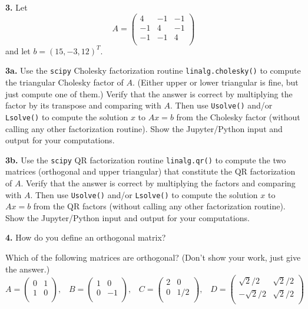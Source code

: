 \documentclass[11pt]{article}
\begin{document}
\par\newpage
{\bf 3.} 
Let
$$A =
   \left(
   \begin{array}{ccc}
    4 & -1 & -1 \\ 	
   -1 &  4 & -1 \\ 
   -1 & -1 &  4 \\
   \end{array} \right)
$$
and let $b = (15, -3, 12)^T$.

\par\medskip
{\bf 3a.}
Use the {\tt scipy} Cholesky factorization routine {\tt linalg.cholesky()}
to compute the triangular Cholesky factor of $A$.
(Either upper or lower triangular is fine, but just compute one of them.)
Verify that the answer is correct by multiplying the factor by its transpose and
comparing with $A$.
Then use {\tt Usolve()} and/or {\tt Lsolve()} to compute the solution $x$
to $Ax=b$ from the Cholesky factor (without calling any other factorization routine).
Show the Jupyter/Python input and output for your computations.

\par\medskip
{\bf 3b.}
Use the {\tt scipy} QR factorization routine {\tt linalg.qr()}
to compute the two matrices (orthogonal and upper triangular) that
constitute the QR factorization of $A$.
Verify that the answer is correct by multiplying the factors and comparing with $A$.
Then use {\tt Usolve()} and/or {\tt Lsolve()} to compute the solution $x$
to $Ax=b$ from the QR factors (without calling any other factorization routine).
Show the Jupyter/Python input and output for your computations.

\par\bigskip
{\bf 4.}
How do you define an orthogonal matrix? 

Which of the following matrices are orthogonal?
(Don't show your work, just give the answer.)
$$
   A =
   \left(
   \begin{array}{cc}
    0 & 1 \\ 	
    1 & 0 \\ 
   \end{array} \right), 
   \hspace{10pt}
   B =
   \left(
   \begin{array}{cc}
    1 & 0 \\ 	
    0 & -1 \\ 
   \end{array} \right), 
   \hspace{10pt}
   C =
   \left(
   \begin{array}{cc}
    2 & 0 \\ 	
    0 & 1/2 \\ 
   \end{array} \right), 
   \hspace{10pt}
   D =
   \left(
   \begin{array}{cc}
    \sqrt 2 / 2 & \sqrt 2 / 2 \\ 	
    -\sqrt 2 / 2 & \sqrt 2 / 2 \\ 	
   \end{array} \right)
$$
\end{document}
